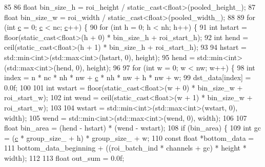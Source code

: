 \begin{DoxyCode}
85 
86             \textcolor{keywordtype}{float} bin\_size\_h = roi\_height / \textcolor{keyword}{static\_cast<}\textcolor{keywordtype}{float}\textcolor{keyword}{>}(pooled\_height\_);
87             \textcolor{keywordtype}{float} bin\_size\_w = roi\_width  / \textcolor{keyword}{static\_cast<}\textcolor{keywordtype}{float}\textcolor{keyword}{>}(pooled\_width\_);
88 
89             \textcolor{keywordflow}{for} (\textcolor{keywordtype}{int} \hyperlink{CMakeCache_8txt_aac1d6a1710812201527c735f7c6afbaa}{c} = 0; \hyperlink{CMakeCache_8txt_aac1d6a1710812201527c735f7c6afbaa}{c} < nc; \hyperlink{CMakeCache_8txt_aac1d6a1710812201527c735f7c6afbaa}{c}++) \{
90                 \textcolor{keywordflow}{for} (\textcolor{keywordtype}{int} h = 0; h < nh; h++) \{
91                     \textcolor{keywordtype}{int} hstart = floor(static\_cast<float>(h + 0) * bin\_size\_h + roi\_start\_h);
92                     \textcolor{keywordtype}{int} hend = ceil(static\_cast<float>(h + 1) * bin\_size\_h + roi\_start\_h);
93 
94                     hstart = std::min<int>(std::max<int>(hstart, 0), height);
95                     hend = std::min<int>(std::max<int>(hend, 0), height);
96 
97                     \textcolor{keywordflow}{for} (\textcolor{keywordtype}{int} w = 0; w < nw; w++) \{
98                         \textcolor{keywordtype}{int} index = n * nc * nh * nw + \hyperlink{CMakeCache_8txt_aac1d6a1710812201527c735f7c6afbaa}{c} * nh * nw + h * nw + w;
99                         dst\_data[index] = 0.0f;
100 
101                         \textcolor{keywordtype}{int} wstart = floor(static\_cast<float>(w + 0) * bin\_size\_w + roi\_start\_w);
102                         \textcolor{keywordtype}{int} wend = ceil(static\_cast<float>(w + 1) * bin\_size\_w + roi\_start\_w);
103 
104                         wstart = std::min<int>(std::max<int>(wstart, 0), width);
105                         wend = std::min<int>(std::max<int>(wend, 0), width);
106 
107                         \textcolor{keywordtype}{float} bin\_area = (hend - hstart) * (wend - wstart);
108                         \textcolor{keywordflow}{if} (bin\_area) \{
109                             \textcolor{keywordtype}{int} gc = (\hyperlink{CMakeCache_8txt_aac1d6a1710812201527c735f7c6afbaa}{c} * group\_size\_ + h) * group\_size\_ + w;
110                             \textcolor{keyword}{const} \textcolor{keywordtype}{float} *bottom\_data =
111                                     bottom\_data\_beginning + ((roi\_batch\_ind * channels + gc) * height * 
      width);
112 
113                             \textcolor{keywordtype}{float} out\_sum = 0.0f;

\end{DoxyCode}
